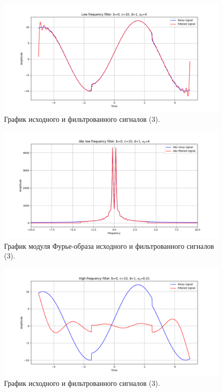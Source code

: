 \documentclass[a4paper, 12pt]{article}
\begin{document}
    \begin{figure}[!htb]
        \centering
        \includegraphics[scale=0.48]{3_1_u_flt_u_nospec.png}
        \captionsetup{skip=0pt}
        \caption{График исходного и фильтрованного сигналов (3).}
        \label{fig:fig93}
    \end{figure}
    \begin{figure}[!htb]
        \centering
        \includegraphics[scale=0.48]{3_1_abs_u_U_nospec.png}
        \captionsetup{skip=0pt}
        \caption{График модуля Фурье-образа исходного и фильтрованного сигналов (3).}
        \label{fig:fig94}
    \end{figure}
    \begin{figure}[!htb]
        \centering
        \includegraphics[scale=0.48]{3_2_u_flt_u_nospec.png}
        \captionsetup{skip=0pt}
        \caption{График исходного и фильтрованного сигналов (3).}
        \label{fig:fig95}
    \end{figure}
\end{document}
